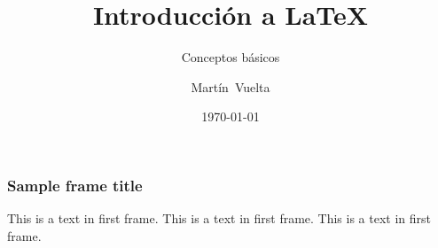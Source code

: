 \documentclass{beamer}
\begin{document}
\title[About Beamer]{Introducción a \LaTeX}
\subtitle{Conceptos básicos}
\author[@zodiacfireworks]{Martín~Vuelta}


\date{\today}
\frame{\titlepage}

\begin{frame}
	\frametitle{Sample frame title}
	This is a text in first frame. This is a text in first frame. This is a text in first frame.
\end{frame}
\end{document}

